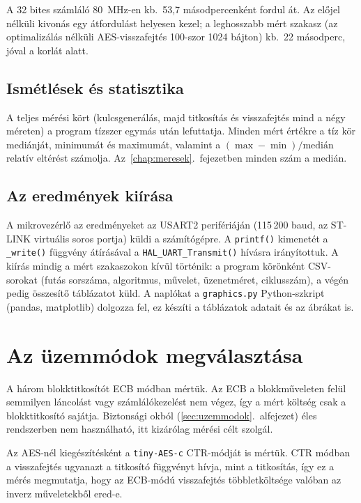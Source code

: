 \documentclass[a4paper,12pt]{report}
\theoremstyle{definition}
\theoremstyle{remark}
\begin{document}
A 32 bites számláló 80~MHz-en kb.\ 53,7 másodpercenként fordul át. Az előjel nélküli kivonás egy átfordulást helyesen kezel; a leghosszabb mért szakasz (az optimalizálás nélküli AES-visszafejtés 100-szor 1024 bájton) kb.\ 22 másodperc, jóval a korlát alatt.

\subsection{Ismétlések és statisztika}

A teljes mérési kört (kulcsgenerálás, majd titkosítás és visszafejtés mind a négy méreten) a program tízszer egymás után lefuttatja. Minden mért értékre a tíz kör mediánját, minimumát és maximumát, valamint a $(\max - \min)/\text{medián}$ relatív eltérést számolja. Az~\ref{chap:meresek}.~fejezetben minden szám a medián.

\subsection{Az eredmények kiírása}

A mikrovezérlő az eredményeket az USART2 perifériáján (115\,200 baud, az ST-LINK virtuális soros portja) küldi a számítógépre. A \texttt{printf()} kimenetét a \texttt{\_write()} függvény átírásával a \texttt{HAL\_UART\_Transmit()} hívásra irányítottuk. A kiírás mindig a mért szakaszokon kívül történik: a program körönként CSV-sorokat (futás sorszáma, algoritmus, művelet, üzenetméret, ciklusszám), a végén pedig összesítő táblázatot küld. A naplókat a \texttt{graphics.py} Python-szkript (pandas, matplotlib) dolgozza fel, ez készíti a táblázatok adatait és az ábrákat is.

\section{Az üzemmódok megválasztása}\label{sec:uzemmod_valasztas}

A három blokktitkosítót ECB módban mértük. Az ECB a blokkműveleten felül semmilyen láncolást vagy számlálókezelést nem végez, így a mért költség csak a blokktitkosító sajátja. Biztonsági okból (\ref{sec:uzemmodok}.~alfejezet) éles rendszerben nem használható, itt kizárólag mérési célt szolgál.

Az AES-nél kiegészítésként a \texttt{tiny-AES-c} CTR-módját is mértük. CTR módban a visszafejtés ugyanazt a titkosító függvényt hívja, mint a titkosítás, így ez a mérés megmutatja, hogy az ECB-módú visszafejtés többletköltsége valóban az inverz műveletekből ered-e.
\end{document}

